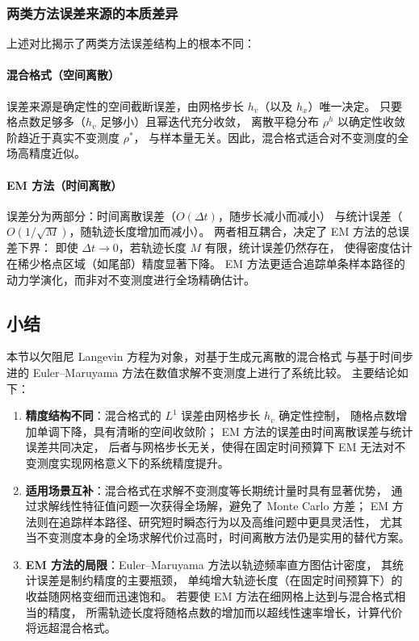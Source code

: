 	\subsubsection{两类方法误差来源的本质差异}
	
	上述对比揭示了两类方法误差结构上的根本不同：
	
	\paragraph{混合格式（空间离散）}
	误差来源是确定性的空间截断误差，由网格步长 $h_v$（以及 $h_x$）唯一决定。
	只要格点数足够多（$h_v$ 足够小）且幂迭代充分收敛，
	离散平稳分布 $\rho^h$ 以确定性收敛阶趋近于真实不变测度 $\rho^*$，
	与样本量无关。因此，混合格式适合对不变测度的全场高精度近似。
	
	\paragraph{EM 方法（时间离散）}
	误差分为两部分：时间离散误差（$O(\Delta t)$，随步长减小而减小）
	与统计误差（$O(1/\sqrt{M})$，随轨迹长度增加而减小）。
	两者相互耦合，决定了 EM 方法的总误差下界：
	即使 $\Delta t \to 0$，若轨迹长度 $M$ 有限，统计误差仍然存在，
	使得密度估计在稀少格点区域（如尾部）精度显著下降。
	EM 方法更适合追踪单条样本路径的动力学演化，而非对不变测度进行全场精确估计。
	
	\subsection{小结}
	
	本节以欠阻尼 Langevin 方程为对象，对基于生成元离散的混合格式
	与基于时间步进的 Euler--Maruyama 方法在数值求解不变测度上进行了系统比较。
	主要结论如下：
	
	\begin{enumerate}
		\item \textbf{精度结构不同}：混合格式的 $L^1$ 误差由网格步长 $h_v$ 确定性控制，
		随格点数增加单调下降，具有清晰的空间收敛阶；
		EM 方法的误差由时间离散误差与统计误差共同决定，
		后者与网格步长无关，使得在固定时间预算下 EM 无法对不变测度实现网格意义下的系统精度提升。
		
		\item \textbf{适用场景互补}：混合格式在求解不变测度等长期统计量时具有显著优势，
		通过求解线性特征值问题一次获得全场解，避免了 Monte Carlo 方差；
		EM 方法则在追踪样本路径、研究短时瞬态行为以及高维问题中更具灵活性，
		尤其当不变测度本身的全场求解代价过高时，时间离散方法仍是实用的替代方案。
		
		\item \textbf{EM 方法的局限}：Euler--Maruyama 方法以轨迹频率直方图估计密度，
		其统计误差是制约精度的主要瓶颈，
		单纯增大轨迹长度（在固定时间预算下）的收益随网格变细而迅速饱和。
		若要使 EM 方法在细网格上达到与混合格式相当的精度，
		所需轨迹长度将随格点数的增加而以超线性速率增长，计算代价将远超混合格式。
	\end{enumerate}
	
